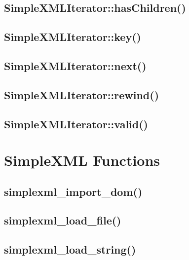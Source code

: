 \subsection{SimpleXMLIterator::hasChildren()}



\subsection{SimpleXMLIterator::key()}


\subsection{SimpleXMLIterator::next()}


\subsection{SimpleXMLIterator::rewind()}


\subsection{SimpleXMLIterator::valid()}





\section{SimpleXML Functions}


\subsection{simplexml\_import\_dom()}



\subsection{simplexml\_load\_file()}


\subsection{simplexml\_load\_string()}













\begin{lstlisting}[language=PHP]

\end{lstlisting}






